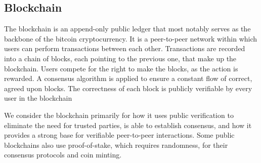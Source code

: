 \subsection{Blockchain}\label{subsec:blockchain}
The blockchain is an append-only public ledger that most notably serves as the backbone of the bitcoin cryptocurrency.
It is a peer-to-peer network within which users can perform transactions between each other.
Transactions are recorded into a chain of blocks, each pointing to the previous one, that make up the blockchain.
Users compete for the right to make the blocks, as the action is rewarded.
A consensus algorithm is applied to ensure a constant flow of correct, agreed upon blocks.
The correctness of each block is publicly verifiable by every user in the blockchain %

We consider the blockchain primarily for how it uses public verification to eliminate the need for trusted parties, is able to establish consensus, and how it provides a strong base for verifiable peer-to-peer interactions. Some public blockchains also use proof-of-stake, which requires randomness, for their consensus protocols and coin minting. 